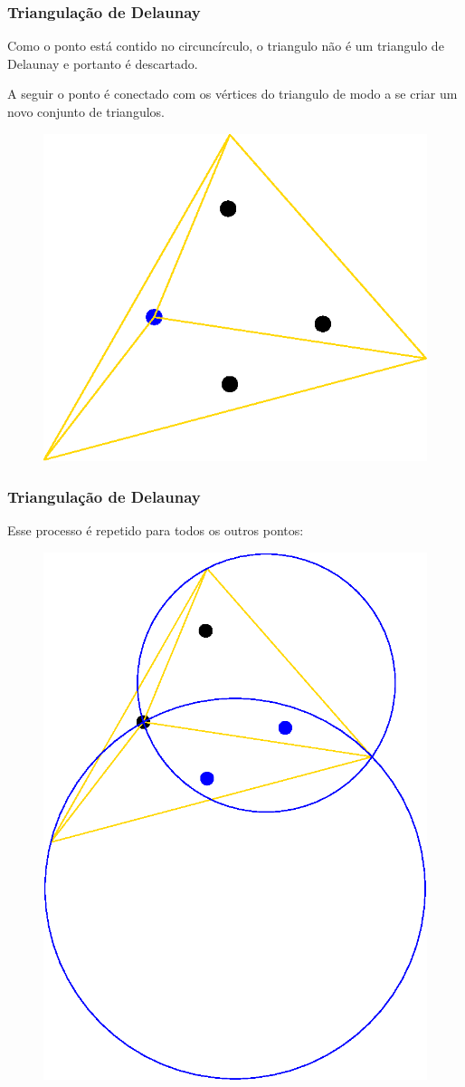 \documentclass{beamer}
\begin{document}
\begin{frame}
  \frametitle{Triangulação de Delaunay}

  Como o ponto está contido no circuncírculo, o triangulo não é um triangulo de Delaunay e portanto é descartado.

  A seguir o ponto é conectado com os vértices do triangulo de modo a se criar um novo conjunto de triangulos.

  \begin{figure}
    \includegraphics[width=0.5\linewidth]{dela7.eps}
  \end{figure}
\end{frame}

\begin{frame}
  \frametitle{Triangulação de Delaunay}

  Esse processo é repetido para todos os outros pontos:

  \begin{figure}
    \includegraphics[width=0.5\linewidth]{dela8.eps}
  \end{figure}
\end{frame}
\end{document}
